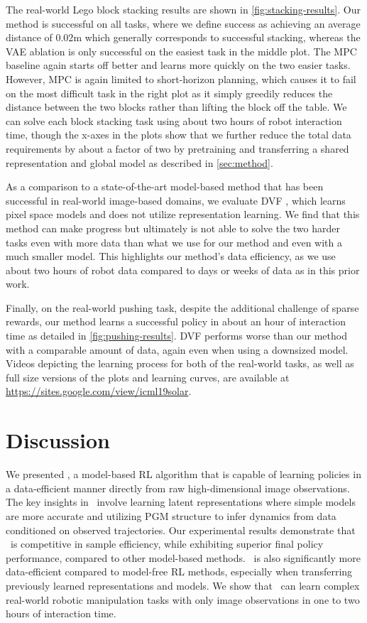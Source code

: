 The real-world Lego block stacking results are shown in \autoref{fig:stacking-results}. Our method is successful on all tasks, where we define success as achieving an average distance of $0.02$m which generally corresponds to successful stacking, whereas the VAE ablation is only successful on the easiest task in the middle plot. The MPC baseline again starts off better and learns more quickly on the two easier tasks. However, MPC is again limited to short-horizon planning, which causes it to fail on the most difficult task in the right plot as it simply greedily reduces the distance between the two blocks rather than lifting the block off the table. We can solve each block stacking task using about two hours of robot interaction time, though the x-axes in the plots show that we further reduce the total data requirements by about a factor of two by pretraining and transferring a shared representation and global model as described in \autoref{sec:method}.

As a comparison to a state-of-the-art model-based method that has been successful in real-world image-based domains, we evaluate DVF \citep{vf}, which learns pixel space models and does not utilize representation learning. We find that this method can make progress but ultimately is not able to solve the two harder tasks even with more data than what we use for our method and even with a much smaller model. This highlights our method's data efficiency, as we use about two hours of robot data compared to days or weeks of data as in this prior work.

Finally, on the real-world pushing task, despite the additional challenge of sparse rewards, our method learns a successful policy in about an hour of interaction time as detailed in \autoref{fig:pushing-results}. DVF performs worse than our method with a comparable amount of data, again even when using a downsized model. Videos depicting the learning process for both of the real-world tasks, as well as full size versions of the plots and learning curves, are available at \mbox{\footnotesize{\url{https://sites.google.com/view/icml19solar}}.}


\section{Discussion}
\label{sec:discussion}

We presented \metabbr, a model-based RL algorithm that is capable of learning policies in a data-efficient manner directly from raw high-dimensional image observations. The key insights in \metabbr\ involve learning latent representations where simple models are more accurate and utilizing PGM structure to infer dynamics from data conditioned on observed trajectories. Our experimental results demonstrate that \metabbr\ is competitive in sample efficiency, while exhibiting superior final policy performance, compared to other model-based methods. \metabbr\ is also significantly more data-efficient compared to model-free RL methods, especially when transferring previously learned representations and models. We show that \metabbr\ can learn complex real-world robotic manipulation tasks with only image observations in one to two hours of interaction time.

